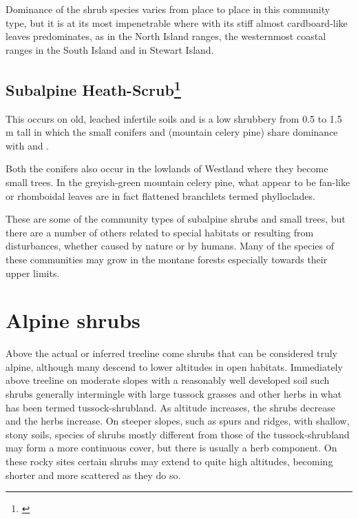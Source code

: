 Dominance of the shrub species varies from place to place in this community type, but it is at its most impenetrable where  with its stiff almost cardboard-like leaves predominates, as in the North Island ranges, the westernmost coastal ranges in the South Island and in Stewart Island.

\subsection[Subalpine Heath-Scrub]{Subalpine Heath-Scrub\footnote{\cite{burrows1979heathlands}}}

This occurs on old, leached infertile soils and is a low shrubbery from 0.5 to 1.5 m tall in which the small conifers  and  (mountain celery pine) share dominance with  and .

Both the conifers also occur in the lowlands of Westland where they become small trees.
In the greyish-green mountain celery pine, what appear to be fan-like or rhomboidal leaves are in fact flattened branchlets termed phylloclades.

These are some of the community types of subalpine shrubs and small trees, but there are a number of others related to special habitats or resulting from disturbances, whether caused by nature or by humans.
Many of the species of these communities may grow in the montane forests especially towards their upper limits.

\section{Alpine shrubs}

Above the actual or inferred treeline come shrubs that can be considered truly alpine, although many descend to lower altitudes in open habitats.
Immediately above treeline on moderate slopes with a reasonably well developed soil such shrubs generally intermingle with large tussock grasses and other herbs in what has been termed tussock-shrubland.
As altitude increases, the shrubs decrease and the herbs increase.
On steeper slopes, such as spurs and ridges, with shallow, stony soils, species of shrubs mostly different from those of the tussock-shrubland may form a more continuous cover, but there is usually a herb component.
On these rocky sites certain shrubs may extend to quite high altitudes, becoming shorter and more scattered as they do so.

